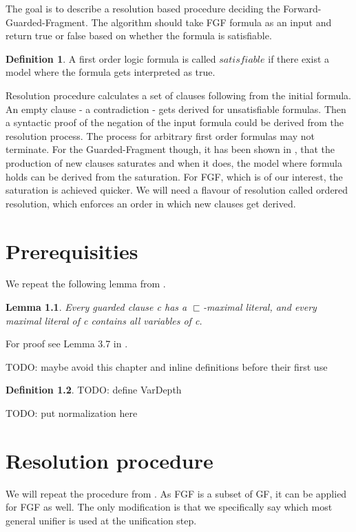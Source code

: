 \documentclass[english, shortabstract]{iithesis}
\theoremstyle{definition} \newtheorem{definition}{Definition}[chapter]
\theoremstyle{remark} \newtheorem{remark}[definition]{Observation}
\theoremstyle{plain} \newtheorem{theorem}[definition]{Theorem}
\theoremstyle{plain} \newtheorem{lemma}[definition]{Lemma}
\begin{document}
The goal is to describe a resolution based procedure deciding the Forward-Guarded-Fragment.
The algorithm should take FGF formula as an input and return true or false based on whether the formula is satisfiable.

\begin{definition}
A first order logic formula is called $satisfiable$ if there exist a model where the formula gets interpreted as true.
\end{definition}

Resolution procedure calculates a set of clauses following from the initial formula.
An empty clause - a contradiction - gets derived for unsatisfiable formulas. 
Then a syntactic proof of the negation of the input formula could be derived from the resolution process.
The process for arbitrary first order formulas may not terminate.
For the Guarded-Fragment though, it has been shown in \cite{resolution GF}, that the production of new clauses saturates
and when it does, the model where formula holds can be derived from the saturation.
For FGF, which is of our interest, the saturation is achieved quicker.
We will need a flavour of resolution called ordered resolution, which enforces an order in which new clauses get derived.

\chapter{Prerequisities}
We repeat the following lemma from \cite{resolution GF}.
\begin{lemma}
Every guarded clause c has a $\sqsubset$-maximal literal, and every maximal literal
of c contains all variables of c.
\end{lemma}
For proof see Lemma 3.7 in \cite{resolution GF}.

TODO: maybe avoid this chapter and inline definitions before their first use
\begin{definition}
    TODO: define VarDepth
\end{definition}

TODO: put normalization here

\chapter{Resolution procedure}

We will repeat the procedure from \cite{resolution gf}. As FGF is a subset of GF, it can be applied for FGF as well.
The only modification is that we specifically say which most general unifier is used at the unification step.
\end{document}

